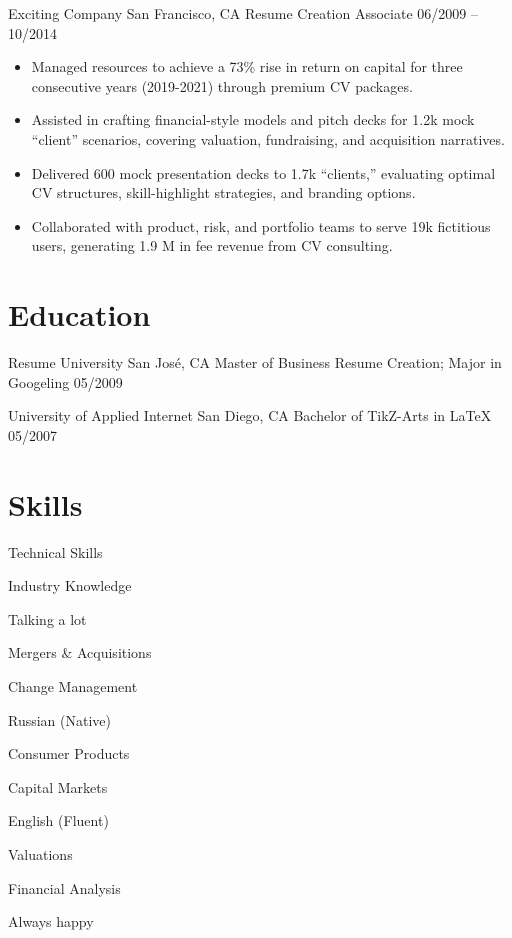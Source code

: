 \documentclass[10pt, a4paper]{bankingcv}
\begin{document}
	\cventry
	{Exciting Company}
	{San Francisco, CA}
	{Resume Creation Associate}
	{06/2009 -- 10/2014}
	
	\begin{itemize}
		\item Managed resources to achieve a 73\% rise in return on capital for three consecutive years (2019-2021) through premium CV packages.
		\item Assisted in crafting financial-style models and pitch decks for 1.2k mock “client” scenarios, covering valuation, fundraising, and acquisition narratives.
		\item Delivered 600 mock presentation decks to 1.7k “clients,” evaluating optimal CV structures, skill-highlight strategies, and branding options.
		\item Collaborated with product, risk, and portfolio teams to serve 19k fictitious users, generating 1.9 M in fee revenue from CV consulting.
	\end{itemize}
	
	\section{Education}
	
	\cveduentry
	{Resume University}								 			%
	{San Jos\'e, CA} 											%
	{Master of Business Resume Creation; Major in Googeling}	%
	{05/2009} 													%
	
	\cveduentry
	{University of Applied Internet}
	{San Diego, CA} 
	{Bachelor of TikZ-Arts in \LaTeX} 
	{05/2007} 		
	
	\section{Skills}
	
	\begin{skillslist}
		\item Technical Skills
		\item Industry Knowledge
		\item Talking a lot
		\item Mergers \& Acquisitions
		\item Change Management
		\item Russian (Native)
		\item Consumer Products
		\item Capital Markets
		\item English (Fluent)
		\item Valuations
		\item Financial Analysis
		\item Always happy
	\end{skillslist}
\end{document}

